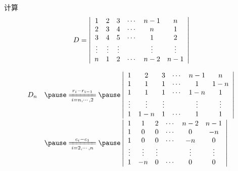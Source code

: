 \begin{frame}
  \begin{footnotesize}
    \begin{exampleblock}{43}
        计算
        $$
        D = \left |
        \begin{array}{cccccc}
          1 &  2 &  3 & \cdots &  n-1 & n\\
          2 &  3 &  4 & \cdots &   n  & 1\\
          3 &  4 &  5 & \cdots &   1  & 2\\
          \vdots& \vdots& \vdots&     & \vdots  & \vdots \\
          n &  1 &  2 & \cdots & n-2  & n-1
        \end{array}
        \right|
        $$
    \end{exampleblock}
    \pause
    \jiename
    $$
    \begin{array}{ll}
      D_n & \pause \disp 
      \xlongequal[i=n,\cdots,2]{r_i-r_{i-1}} \pause
      \left|
      \begin{array}{cccccc}
        1   &  2 &  3 & \cd &  n-1 & n\\
        1   &  1 &  1 & \cd &   1  & 1-n \\
        1   &  1 &  1 & \cd &  1-n  & 1\\
        \vd & \vd & \vd&     & \vd  & \vd \\
        1   & 1-n &  1 & \cd &   1   & 1
      \end{array}
      \right| \\[1.0cm]
      & \pause\disp 
      \xlongequal[i=2,\cdots,n]{c_i-c_1} \pause
      \left|
      \begin{array}{cccccc}
        1   &  1 &  2 & \cd &  n-2 & n-1\\
        1   &  0 &  0 & \cd &   0  & -n \\
        1   &  0 &  0 & \cd &  -n  & 0\\
        \vd & \vd & \vd&     & \vd  & \vd \\
        1   & -n &  0 & \cd &   0   & 0
      \end{array}
      \right|
    \end{array}
    $$

  \end{footnotesize}
\end{frame}


